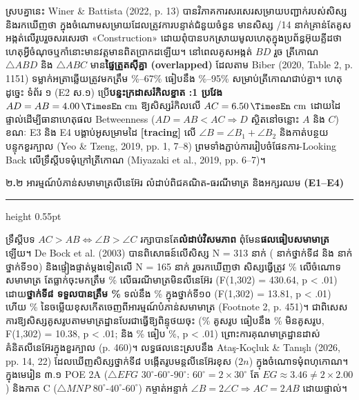 \documentclass[a4paper,12pt]{article}
\newcommand{\en}[1]{{\TimesEn #1}}
\newcommand{\enbf}[1]{{\TimesEn\textbf{#1}}}
\newcommand{\unit}[1]{\,\text{\en{#1}}}
\newcommand{\tri}[1]{\ensuremath{\triangle #1}}
\newcommand{\ang}[1]{\ensuremath{\angle #1}}
\newcommand{\subsectitle}[1]{{\muol\fontsize{11pt}{14.5pt}\selectfont #1}}
\newcommand{\subsec}[1]{%
  \Needspace{1.6cm}%
  \vspace{2pt}%
  \subsectitle{#1}\par%
  \vspace{-2pt}%
  {\color{black}\hrule height 0.55pt}%
  \vspace{2pt}%
}
\begin{document}
ស្របគ្នានេះ \en{Winer \& Battista (2022, p. 13)} បានវិភាគការសរសេរសម្រាយបញ្ជាក់របស់សិស្ស និងរកឃើញថា ក្នុងចំណោមសម្រាយដែលត្រូវការបន្ទាត់ជំនួយចំនួន \en{14} មានសិស្ស \en{6/14} នាក់គ្រាន់តែគូសអង្កត់លើរូបរួចសរសេរថា \en{«Construction»} ដោយពុំបានបកស្រាយមូលហេតុក្នុងប្រព័ន្ធអ៊ុយគ្លីដថាហេតុអ្វីចំណុចឬកាំនោះមានវត្តមានពិតប្រាកដឡើយ។ នៅពេលគូសអង្កត់ $BD$ រួច ត្រីកោណ $\tri{ABD}$ និង $\tri{ABC}$ មាន\textbf{ផ្ទៃត្រួតស៊ីគ្នា (\en{overlapped})} ដែលតាម \en{Biber (2020, Table 2, p. 1151)} ទម្លាក់អត្រាឆ្លើយត្រូវមកត្រឹម \en{44\%--67\%} ធៀបនឹង \en{71\%--95\%} សម្រាប់ត្រីកោណជាប់គ្នា។ ហេតុដូច្នេះ ទំព័រ ១ (\en{E2} ស.១) ប្រើ\textbf{បន្ទះក្រដាសរំកិលខ្នាត \en{1:1} ប្រវែង $AD=AB=4.00\unit{cm}$} ឱ្យសិស្សរំកិលលើ $AC=6.50\unit{cm}$ ដោយដៃផ្ទាល់ដើម្បីធានាហេតុផល \en{Betweenness} ($AD=AB<AC\Rightarrow D$ ស្ថិតនៅចន្លោះ $A$ និង $C$) ខណៈ \en{E3} និង \en{E4} បង្គាប់អូសម្រាមដៃ \en{\textbf{[tracing]}} លើ $\ang{B}=\ang{B_1}+\ang{B_2}$ និងកាត់បន្ថយបន្ទុកខួរក្បាល \en{(Yeo \& Tzeng, 2019, pp. 1, 7--8)} ព្រមទាំងភ្ជាប់ការរៀបចំផែនការ-\en{Looking Back} លើទ្រឹស្ដីបទមុំក្រៅត្រីកោណ \en{(Miyazaki et al., 2019, pp. 6--7)}។

\subsec{២\enbf{.}២ អារម្មណ៍បំភាន់សមាមាត្រលីនេអ៊ែរ លំដាប់ពិជគណិត\enbf{-}ធរណីមាត្រ និងអក្សរឈម \enbf{(E1--E4)}}

ទ្រឹស្ដីបទ $AC>AB\Leftrightarrow\ang{B}>\ang{C}$ រក្សាបានតែ\textbf{លំដាប់វិសមភាព} ពុំមែន\textbf{ផលធៀបសមាមាត្រ}ឡើយ។ \en{De Bock et al. (2003)} បានពិសោធន៍លើសិស្ស \en{N = 313} នាក់ (\en{152} នាក់ថ្នាក់ទី៨ និង \en{161} នាក់ថ្នាក់ទី១០) និងផ្ទៀងផ្ទាត់ម្តងទៀតលើ \en{N = 165} នាក់ រួចរកឃើញថា សិស្សធ្វើត្រូវ \en{95\%} លើចំណោទសមាមាត្រ តែធ្លាក់ចុះមកត្រឹម \en{33\%} លើធរណីមាត្រមិនលីនេអ៊ែរ (\en{F(1,302) = 430.64, p < .01}) ដោយ\textbf{ថ្នាក់ទី៨ ទទួលបានត្រឹម \en{23\%}} ទល់នឹង \en{43\%} ក្នុងថ្នាក់ទី១០ (\en{F(1,302) = 13.81, p < .01}) ហើយ \en{95\%} នៃចម្លើយខុសកើតចេញពីអារម្មណ៍បំភាន់សមាមាត្រ \en{(Footnote 2, p. 451)}។ ជាពិសេស ការឱ្យសិស្សគូសរូបតាមមាត្រដ្ឋានបែរជាធ្វើឱ្យពិន្ទុថយចុះ (\en{23\%} គូសរូប ធៀបនឹង \en{44\%} មិនគូសរូប, \en{F(1,302) = 10.38, p < .01}; និង \en{40\%} ធៀប \en{62\%}, \en{p < .01}) ព្រោះការគុណមាត្រដ្ឋានដាស់គំនិតលីនេអ៊ែរក្នុងខួរក្បាល \en{(p. 460)}។ លទ្ធផលនេះស្របនឹង \en{Ataş-Koçluk \& Tanışlı (2026, pp. 14, 22)} ដែលឃើញសិស្សថ្នាក់ទី៨ បង្កើតរូបមន្តលីនេអ៊ែរខុស ($2n$) ក្នុងចំណោទមុំពហុកោណ។ ក្នុងមេរៀន ៣.១ \en{POE 2A} ($\tri{EFG}$ $30^\circ\text{-}60^\circ\text{-}90^\circ$: $60^\circ=2\times 30^\circ$ តែ $EG\approx 3.46\neq 2\times 2.00$) និងកាត \en{C} ($\tri{MNP}$ $80^\circ\text{-}40^\circ\text{-}60^\circ$) កម្ចាត់អន្ទាក់ $\ang{B}=2\ang{C}\Rightarrow AC=2AB$ ដោយផ្ទាល់។
\end{document}

